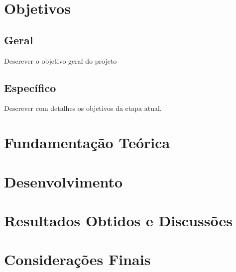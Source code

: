 \documentclass[
	12pt,				%
	openright,			%
	a4paper,			%
	english,			%
	french,				%
	spanish,			%
	brazilian,				%
	]{abntex2}
\begin{document}
\chapter[Objetivos]{Objetivos}
\section{Geral}
Descrever o objetivo geral do projeto
\section{Específico}
Descrever com detalhes os objetivos da etapa atual.

\chapter{Fundamentação Teórica}


\chapter{Desenvolvimento}


\chapter{Resultados Obtidos e Discussões}


\chapter{Considerações Finais}





\postextual




\end{document}

